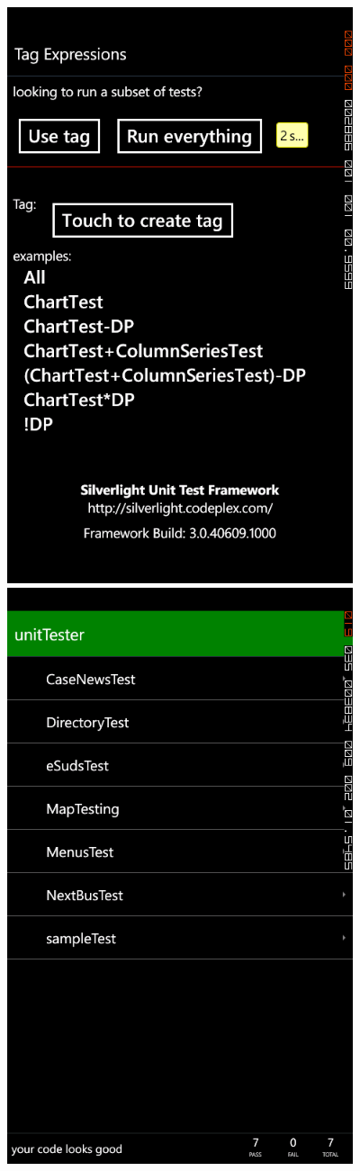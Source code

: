 \documentclass[pdftex,12pt,letter]{article}
\begin{document}
\includegraphics[width=4in]{ss2.png}
\FloatBarrier
\includegraphics[width=4in]{ss3.png}
\end{document}
